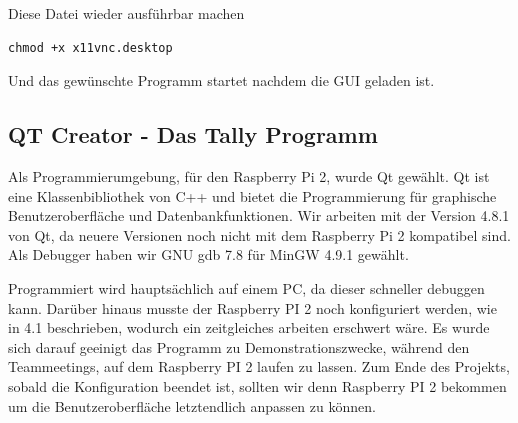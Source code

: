 \documentclass[11pt,a4paper]{article} %
\begin{document}
Diese Datei wieder ausf\"uhrbar machen
\begin{frame}

\begin{lstlisting}
chmod +x x11vnc.desktop
\end{lstlisting}
\end{frame}
Und das gew\"unschte Programm startet nachdem die GUI geladen ist.



\subsection{QT Creator - Das Tally Programm}
Als Programmierumgebung, für den Raspberry Pi 2, wurde Qt gewählt.
Qt ist eine Klassenbibliothek von C++ und bietet die Programmierung für  graphische Benutzeroberfläche und Datenbankfunktionen.
Wir arbeiten mit der Version 4.8.1 von Qt, da neuere Versionen noch nicht mit dem Raspberry Pi 2 kompatibel sind.
Als Debugger haben wir GNU gdb 7.8 für MinGW 4.9.1 gewählt.
\par
Programmiert wird hauptsächlich auf einem PC, da dieser schneller debuggen kann.
Darüber hinaus musste der Raspberry PI 2 noch konfiguriert werden, wie in 4.1 beschrieben, wodurch ein zeitgleiches arbeiten erschwert wäre.
Es wurde sich darauf geeinigt das Programm zu Demonstrationszwecke, während den Teammeetings, auf dem Raspberry PI 2 laufen zu lassen.
Zum Ende des Projekts, sobald die Konfiguration beendet ist, sollten wir denn Raspberry PI 2 bekommen um die Benutzeroberfläche letztendlich anpassen zu können.
\par
\end{document}
